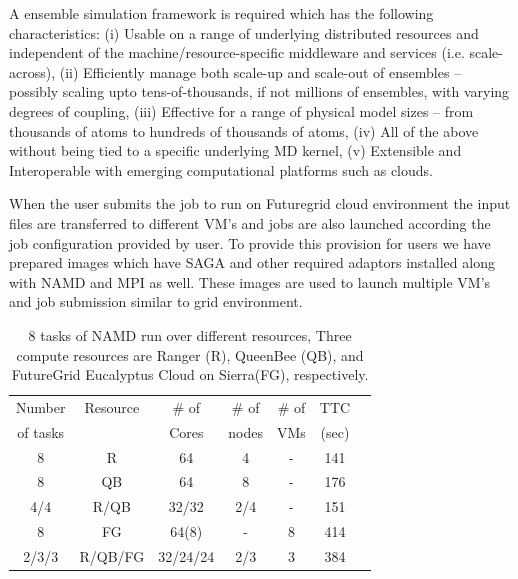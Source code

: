 \documentclass{sig-alternate}
\begin{document}
A ensemble simulation framework is required which has the following
characteristics: (i) Usable on a range of underlying distributed
resources and independent of the machine/resource-specific middleware
and services (i.e. scale-across), (ii) Efficiently manage both
scale-up and scale-out of ensembles -- possibly scaling upto
tens-of-thousands, if not millions of ensembles, with varying degrees
of coupling, (iii) Effective for a range of physical model sizes --
from thousands of atoms to hundreds of thousands of atoms, (iv) All of
the above without being tied to a specific underlying MD kernel, (v)
Extensible and Interoperable with emerging computational platforms such
as clouds.


When the user submits the job to run on Futuregrid cloud environment the input files are transferred to different VM's 
 and jobs are also launched according the job configuration provided by user. To provide this provision for users we have prepared images which have SAGA and 
other required adaptors installed along with NAMD and MPI as well.  These images are used to launch multiple VM's and job submission similar to grid environment.

 \begin{table}
\small
 \begin{tabular}{|c|c|c|c|c|c|c|} 
 \hline 
 Number           & Resource    & \# of &  \# of     &     \# of     &	TTC  \\
of tasks                &     &  Cores    &nodes&   VMs  & (sec) \\  
\hline
8& R&	64	&4 & - &141\\
\hline                  
8& QB	&	64& 8 &	-&176 \\
\hline
4/4&R/QB	&	32/32 &2/4&-&151\\
\hline
8&FG	&	64(8) & - &8&414 \\
\hline
2/3/3&R/QB/FG	&32/24/24&2/3&	3 &384\\
\hline


\end{tabular}
\caption{8 tasks of NAMD run over different resources, Three compute resources are Ranger (R), QueenBee (QB), and  FutureGrid  Eucalyptus Cloud on Sierra(FG), respectively.}

  \label{table:HTHP-Distributed} 
\end{table}
\end{document}
